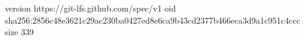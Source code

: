 version https://git-lfs.github.com/spec/v1
oid sha256:2856c48e3621c29ac230ba0427ed8e6ca9b43cd2377b466eca3d9a1c951c4ccc
size 339
